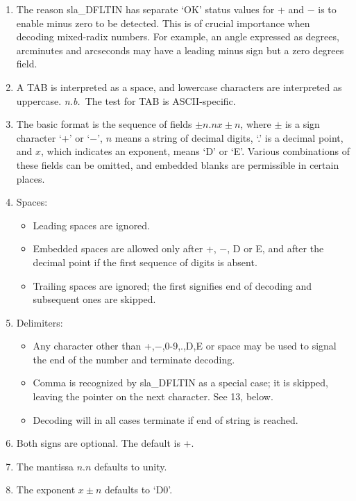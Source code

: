 \documentclass[11pt,twoside,nolof]{starlink}
\begin{document}
{
 \begin{enumerate}
 \item The reason sla\_DFLTIN has separate `OK' status values
       for + and $-$ is to enable minus zero to be detected.
       This is of crucial importance
       when decoding mixed-radix numbers.  For example, an angle
       expressed as degrees, arcminutes and arcseconds may have a
       leading minus sign but a zero degrees field.
 \item A TAB is interpreted as a space, and lowercase characters are
       interpreted as uppercase.  \textit{n.b.}\ The test for TAB is
       ASCII-specific.
 \item The basic format is the sequence of fields $\pm n.n x \pm n$,
       where $\pm$ is a sign
       character `+' or `$-$', $n$ means a string of decimal digits,
       `.' is a decimal point, and $x$, which indicates an exponent,
       means `D' or `E'.  Various combinations of these fields can be
       omitted, and embedded blanks are permissible in certain places.
 \item Spaces:
       \begin{itemize}
       \item Leading spaces are ignored.
       \item Embedded spaces are allowed only after +, $-$, D or E,
             and after the decimal point if the first sequence of
             digits is absent.
       \item Trailing spaces are ignored;  the first signifies
             end of decoding and subsequent ones are skipped.
       \end{itemize}
 \item Delimiters:
       \begin{itemize}
       \item Any character other than +,$-$,0-9,.,D,E or space may be
             used to signal the end of the number and terminate decoding.
       \item Comma is recognized by sla\_DFLTIN as a special case; it
             is skipped, leaving the pointer on the next character.  See
             13, below.
       \item Decoding will in all cases terminate if end of string
             is reached.
       \end{itemize}
 \item Both signs are optional.  The default is +.
 \item The mantissa $n.n$ defaults to unity.
 \item The exponent $x\!\pm\!n$ defaults to `D0'.

\end{enumerate}}
\end{document}
